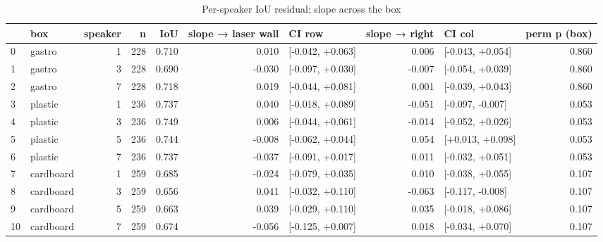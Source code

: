 \begin{table}
\caption{Per-speaker IoU residual: slope across the box}
\label{tab:speaker_residual}
\begin{tabular}{llrrrrlrlr}
\toprule
 & box & speaker & n & IoU & slope → laser wall & CI row & slope → right & CI col & perm p (box) \\
\midrule
0 & gastro & 1 & 228 & 0.710 & 0.010 & [-0.042, +0.063] & 0.006 & [-0.043, +0.054] & 0.860 \\
1 & gastro & 3 & 228 & 0.690 & -0.030 & [-0.097, +0.030] & -0.007 & [-0.054, +0.039] & 0.860 \\
2 & gastro & 7 & 228 & 0.718 & 0.019 & [-0.044, +0.081] & 0.001 & [-0.039, +0.043] & 0.860 \\
3 & plastic & 1 & 236 & 0.737 & 0.040 & [-0.018, +0.089] & -0.051 & [-0.097, -0.007] & 0.053 \\
4 & plastic & 3 & 236 & 0.749 & 0.006 & [-0.044, +0.061] & -0.014 & [-0.052, +0.026] & 0.053 \\
5 & plastic & 5 & 236 & 0.744 & -0.008 & [-0.062, +0.044] & 0.054 & [+0.013, +0.098] & 0.053 \\
6 & plastic & 7 & 236 & 0.737 & -0.037 & [-0.091, +0.017] & 0.011 & [-0.032, +0.051] & 0.053 \\
7 & cardboard & 1 & 259 & 0.685 & -0.024 & [-0.079, +0.035] & 0.010 & [-0.038, +0.055] & 0.107 \\
8 & cardboard & 3 & 259 & 0.656 & 0.041 & [-0.032, +0.110] & -0.063 & [-0.117, -0.008] & 0.107 \\
9 & cardboard & 5 & 259 & 0.663 & 0.039 & [-0.029, +0.110] & 0.035 & [-0.018, +0.086] & 0.107 \\
10 & cardboard & 7 & 259 & 0.674 & -0.056 & [-0.125, +0.007] & 0.018 & [-0.034, +0.070] & 0.107 \\
\bottomrule
\end{tabular}
\end{table}
